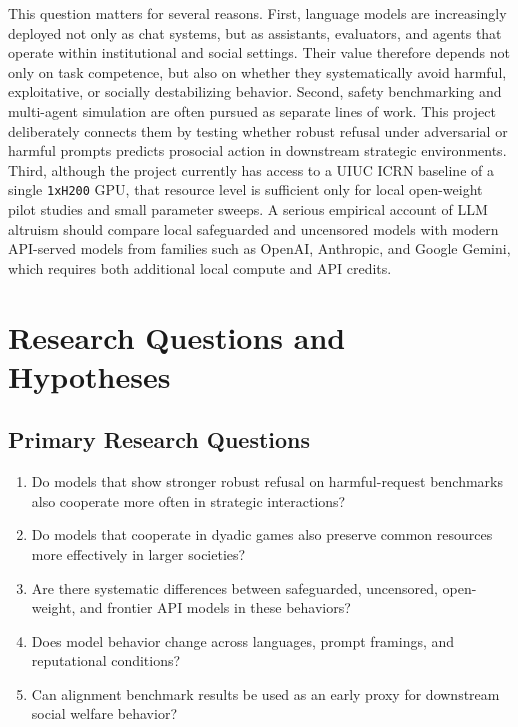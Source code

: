 \documentclass{article}
\begin{document}
This question matters for several reasons. First, language models are increasingly deployed not only as chat systems, but as assistants, evaluators, and agents that operate within institutional and social settings. Their value therefore depends not only on task competence, but also on whether they systematically avoid harmful, exploitative, or socially destabilizing behavior. Second, safety benchmarking and multi-agent simulation are often pursued as separate lines of work. This project deliberately connects them by testing whether robust refusal under adversarial or harmful prompts predicts prosocial action in downstream strategic environments. Third, although the project currently has access to a UIUC ICRN baseline of a single \texttt{1xH200} GPU, that resource level is sufficient only for local open-weight pilot studies and small parameter sweeps. A serious empirical account of LLM altruism should compare local safeguarded and uncensored models with modern API-served models from families such as OpenAI, Anthropic, and Google Gemini, which requires both additional local compute and API credits.

\section{Research Questions and Hypotheses}
\subsection*{Primary Research Questions}
\begin{enumerate}
    \item Do models that show stronger robust refusal on harmful-request benchmarks also cooperate more often in strategic interactions?
    \item Do models that cooperate in dyadic games also preserve common resources more effectively in larger societies?
    \item Are there systematic differences between safeguarded, uncensored, open-weight, and frontier API models in these behaviors?
    \item Does model behavior change across languages, prompt framings, and reputational conditions?
    \item Can alignment benchmark results be used as an early proxy for downstream social welfare behavior?
\end{enumerate}
\end{document}
